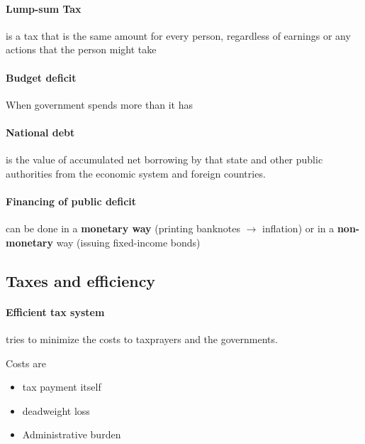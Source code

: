 \documentclass[a4paper,titlepage] {scrartcl}
\begin{document}
\paragraph{Lump-sum Tax} %
\label{par:lump_sum_tax}
is a tax that is the same amount for every person, regardless of earnings or any actions that the person might take

\paragraph{Budget deficit} %
\label{par:budget_deficit}
When government spends more than it has

\paragraph{National debt} %
\label{par:national_debt}
is the value of accumulated net borrowing by that state and other public authorities from the economic system and foreign countries.


\paragraph{Financing of public deficit} %
\label{par:financing_of_public_deficit}		
can be done in a \textbf{monetary way} (printing banknotes $\rightarrow$ inflation) or in a \textbf{non-monetary} way (issuing fixed-income bonds)



\subsection{Taxes and efficiency} %
\label{sub:taxes_and_efficiency}
\paragraph{Efficient tax system} %
\label{par:efficient_tax_system}
tries to minimize the costs to taxprayers and the governments.

Costs are	\begin{itemize}
	\item tax payment itself
	\item deadweight loss
	\item Administrative burden
\end{itemize}
\end{document}
